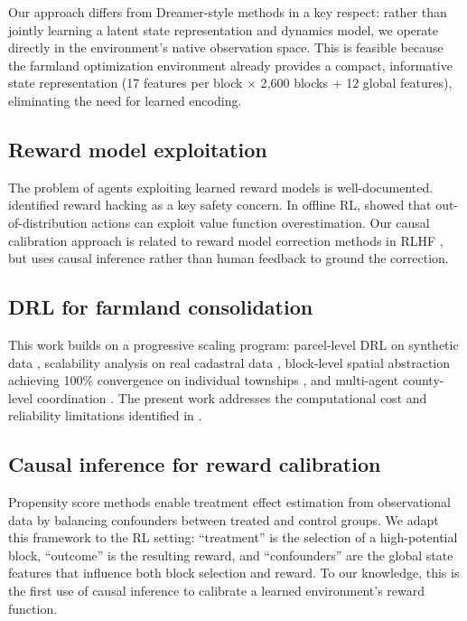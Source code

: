 \documentclass[11pt]{article}
\begin{document}
Our approach differs from Dreamer-style methods in a key respect: rather than jointly learning a latent state representation and dynamics model, we operate directly in the environment's native observation space. This is feasible because the farmland optimization environment already provides a compact, informative state representation (17 features per block $\times$ 2{,}600 blocks + 12 global features), eliminating the need for learned encoding.

\subsection{Reward model exploitation}

The problem of agents exploiting learned reward models is well-documented. \citet{amodei2016concrete} identified reward hacking as a key safety concern. In offline RL, \citet{levine2020offline} showed that out-of-distribution actions can exploit value function overestimation. Our causal calibration approach is related to reward model correction methods in RLHF \citep{bai2022training}, but uses causal inference rather than human feedback to ground the correction.

\subsection{DRL for farmland consolidation}

This work builds on a progressive scaling program: parcel-level DRL on synthetic data \citep{zhou2026transferable}, scalability analysis on real cadastral data \citep{zhou2026scaling}, block-level spatial abstraction achieving 100\% convergence on individual townships \citep{zhou2026block}, and multi-agent county-level coordination \citep{zhou2026county}. The present work addresses the computational cost and reliability limitations identified in \citet{zhou2026county}.

\subsection{Causal inference for reward calibration}

Propensity score methods \citep{stuart2010matching} enable treatment effect estimation from observational data by balancing confounders between treated and control groups. We adapt this framework to the RL setting: ``treatment'' is the selection of a high-potential block, ``outcome'' is the resulting reward, and ``confounders'' are the global state features that influence both block selection and reward. To our knowledge, this is the first use of causal inference to calibrate a learned environment's reward function.
\end{document}
